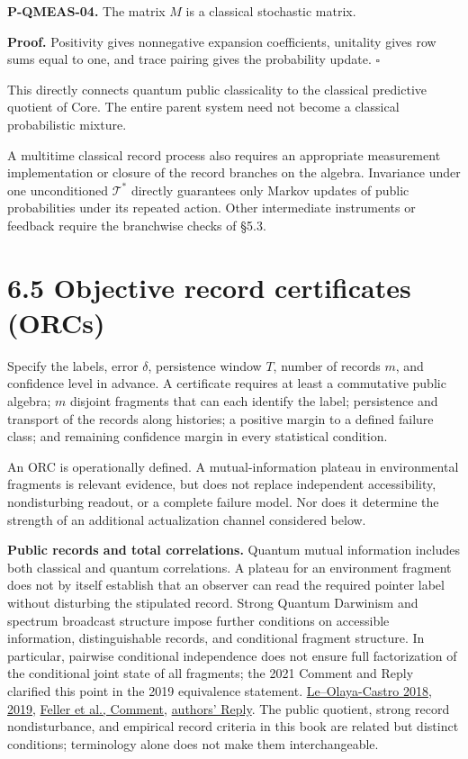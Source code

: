 \documentclass[
  11pt,
  oneside]{book}
\begin{document}
\label{p-qmeas-04}{}

\textbf{P-QMEAS-04.} The matrix \(M\) is a classical stochastic matrix.

\textbf{Proof.} Positivity gives nonnegative expansion coefficients,
unitality gives row sums equal to one, and trace pairing gives the
probability update. \(\square\)

This directly connects quantum public classicality to the classical
predictive quotient of Core. The entire parent system need not become a
classical probabilistic mixture.

A multitime classical record process also requires an appropriate
measurement implementation or closure of the record branches on the
algebra. Invariance under one unconditioned \(\mathcal T^*\) directly
guarantees only Markov updates of public probabilities under its
repeated action. Other intermediate instruments or feedback require the
branchwise checks of §5.3.

\section{6.5 Objective record certificates (ORCs)}

Specify the labels, error \(\delta\), persistence window \(T\), number
of records \(m\), and confidence level in advance. A certificate
requires at least a commutative public algebra; \(m\) disjoint fragments
that can each identify the label; persistence and transport of the
records along histories; a positive margin to a defined failure class;
and remaining confidence margin in every statistical condition.

An ORC is operationally defined. A mutual-information plateau in
environmental fragments is relevant evidence, but does not replace
independent accessibility, nondisturbing readout, or a complete failure
model. Nor does it determine the strength of an additional actualization
channel considered below.

\textbf{Public records and total correlations.} Quantum mutual
information includes both classical and quantum correlations. A plateau
for an environment fragment does not by itself establish that an
observer can read the required pointer label without disturbing the
stipulated record. Strong Quantum Darwinism and spectrum broadcast
structure impose further conditions on accessible information,
distinguishable records, and conditional fragment structure. In
particular, pairwise conditional independence does not ensure full
factorization of the conditional joint state of all fragments; the 2021
Comment and Reply clarified this point in the 2019 equivalence
statement.
\href{https://doi.org/10.1103/PhysRevA.98.032103}{Le--Olaya-Castro
2018}, \href{https://doi.org/10.1103/PhysRevLett.122.010403}{2019},
\href{https://doi.org/10.1103/PhysRevLett.126.188901}{Feller et al.,
Comment}, \href{https://doi.org/10.1103/PhysRevLett.126.188902}{authors'
Reply}. The public quotient, strong record nondisturbance, and empirical
record criteria in this book are related but distinct conditions;
terminology alone does not make them interchangeable.
\end{document}
